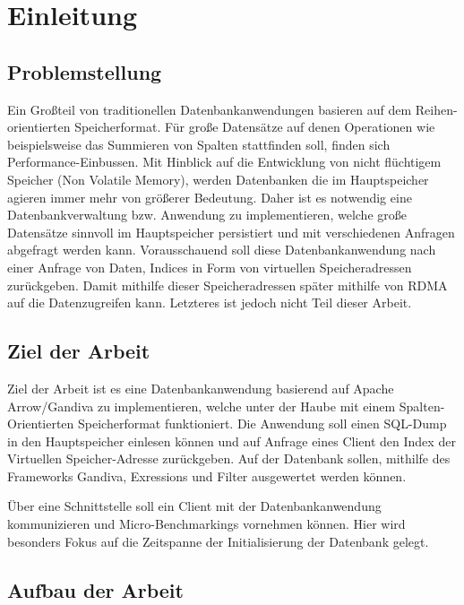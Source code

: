 \chapter{Einleitung}

\section{Problemstellung}
Ein Großteil von traditionellen Datenbankanwendungen basieren auf dem Reihen-orientierten Speicherformat. Für große Datensätze auf denen Operationen wie beispielsweise das Summieren von Spalten stattfinden soll, finden sich Performance-Einbussen.
Mit Hinblick auf die Entwicklung von nicht flüchtigem Speicher (Non Volatile Memory), werden Datenbanken die im Hauptspeicher agieren immer mehr von größerer Bedeutung. Daher ist es notwendig eine Datenbankverwaltung bzw. Anwendung zu implementieren, welche große Datensätze sinnvoll im Hauptspeicher persistiert und mit verschiedenen Anfragen abgefragt werden kann.
Vorausschauend soll diese Datenbankanwendung nach einer Anfrage von Daten, Indices in Form von virtuellen Speicheradressen zurückgeben. Damit mithilfe dieser Speicheradressen später mithilfe von RDMA auf die Datenzugreifen kann. Letzteres ist jedoch nicht Teil dieser Arbeit. 


\section{Ziel der Arbeit}
Ziel der Arbeit ist es eine Datenbankanwendung basierend auf Apache Arrow/Gandiva zu implementieren, welche unter der Haube mit einem Spalten-Orientierten Speicherformat funktioniert. Die Anwendung soll einen SQL-Dump in den Hauptspeicher einlesen können und auf Anfrage eines Client den Index der Virtuellen Speicher-Adresse zurückgeben. Auf der Datenbank sollen, mithilfe des Frameworks Gandiva, Exressions und Filter ausgewertet werden können.

Über eine Schnittstelle soll ein Client mit der Datenbankanwendung kommunizieren und Micro-Benchmarkings vornehmen können. Hier wird besonders Fokus auf die Zeitspanne der Initialisierung der Datenbank gelegt.


\section{Aufbau der Arbeit}

